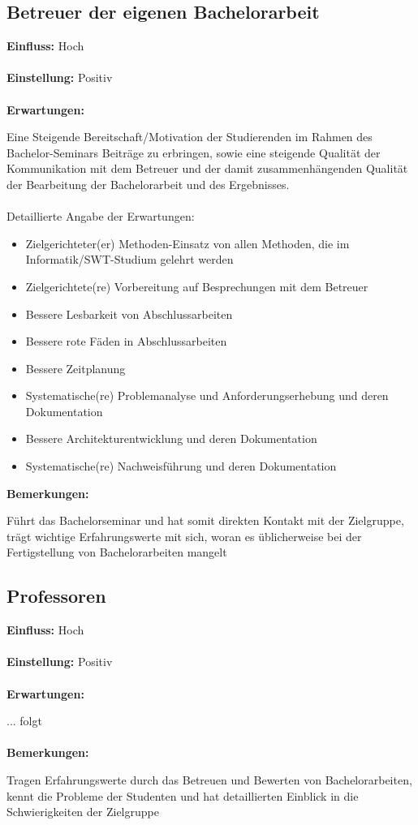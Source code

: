 \documentclass{scrreprt}
\begin{document}
\subsection{Betreuer der eigenen Bachelorarbeit}
\textbf{Einfluss:} Hoch\\\\
\textbf{Einstellung:} Positiv\\\\
\textbf{Erwartungen:}\par Eine Steigende Bereitschaft/Motivation der Studierenden im Rahmen des Bachelor-Seminars Beiträge zu erbringen, sowie eine steigende Qualität der Kommunikation mit dem Betreuer und der damit zusammenhängenden Qualität der Bearbeitung der Bachelorarbeit und des Ergebnisses.
\\\\Detaillierte Angabe der Erwartungen:
\begin{itemize}
\item Zielgerichteter(er) Methoden-Einsatz von allen Methoden, die im Informatik/SWT-Studium gelehrt werden
\item Zielgerichtete(re) Vorbereitung auf Besprechungen mit dem Betreuer
\item Bessere Lesbarkeit von Abschlussarbeiten
\item Bessere \glqq rote Fäden\grqq{} in Abschlussarbeiten
\item Bessere Zeitplanung
\item Systematische(re) Problemanalyse und Anforderungserhebung und deren Dokumentation
\item Bessere Architekturentwicklung und deren Dokumentation
\item Systematische(re) Nachweisführung und deren Dokumentation
\end{itemize}
\textbf{Bemerkungen:}\par Führt das Bachelorseminar und hat somit direkten Kontakt mit der Zielgruppe, trägt wichtige Erfahrungswerte mit sich, woran es üblicherweise bei der Fertigstellung von Bachelorarbeiten mangelt
\newpage

\subsection{Professoren}
\textbf{Einfluss:} Hoch\\\\
\textbf{Einstellung:} Positiv\\\\
\textbf{Erwartungen:}\par ... folgt\\\\
\textbf{Bemerkungen:}\par Tragen Erfahrungswerte durch das Betreuen und Bewerten von Bachelorarbeiten, kennt die Probleme der Studenten und hat detaillierten Einblick in die Schwierigkeiten der Zielgruppe
\end{document}
